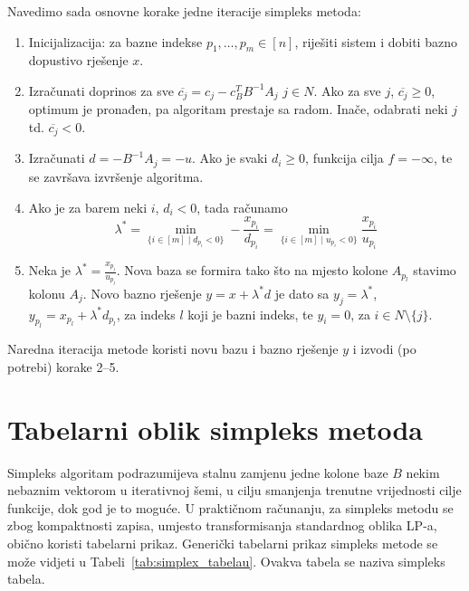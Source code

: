 \documentclass[a4paper, utf8, 11pt, colorlinks]{book}
\theoremstyle{definition}
\begin{document}
Navedimo sada osnovne korake jedne iteracije simpleks metoda:
\begin{enumerate}
    \item Inicijalizacija: za bazne indekse $p_1,\ldots,p_m \in [n]$, riješiti sistem i dobiti bazno dopustivo rješenje $x$. 
    \item Izračunati doprinos za sve $\overline{c_j} = c_j - c_B^T B^{-1}A_j $
          $j \in N$. Ako za sve $j$, $\overline{c_j} \geq 0$, optimum je pronađen, pa algoritam prestaje sa radom. Inače, odabrati neki $j$  td. $\overline{c_j}<0$.
    \item Izračunati $d = -B^{-1}A_j = -u$. Ako je svaki $d_i \geq  0$, funkcija cilja  $f = - \infty$, te se završava izvršenje algoritma. 
    \item Ako je za barem neki $i$, $d_i < 0$, tada računamo 
             $$ \lambda^* = \min_{ \{i\in [m] \mid d_{p_i} < 0  \}} - \frac{x_{p_i}}{d_{p_i}} =  \min_{ \{i\in [m] \mid u_{p_i} < 0  \}} \frac{x_{p_i}}{u_{p_i}} $$
    \item Neka je $\lambda^* = \frac{x_{p_l}}{u_{p_l}}$. Nova baza se formira tako što na mjesto kolone $A_{p_l}$ stavimo kolonu $A_j$. Novo bazno rješenje 
    $y = x + \lambda^*d $ je dato sa $y_j = \lambda^*$, $y_{p_l} = x_{p_l} + \lambda^* d_{p_l}$, za indeks $l$ koji je bazni indeks, te $y_i = 0$, za $i \in N \setminus \{j\}$. 
\end{enumerate}

Naredna iteracija metode koristi novu bazu i bazno rješenje $y$ i izvodi (po potrebi) korake 2--5. 



\section{Tabelarni oblik simpleks metoda}

Simpleks algoritam podrazumijeva stalnu zamjenu jedne kolone baze $B$ nekim nebaznim vektorom u iterativnoj šemi, u cilju smanjenja trenutne vrijednosti cilje funkcije, dok god je to moguće. 
U praktičnom računanju, za simpleks metodu se zbog kompaktnosti zapisa,  umjesto transformisanja standardnog oblika LP-a, obično koristi tabelarni prikaz.
Generički tabelarni  prikaz simpleks metode se može vidjeti u Tabeli~\ref{tab:simplex_tabelau}. Ovakva tabela se naziva  simpleks tabela.
\end{document}

